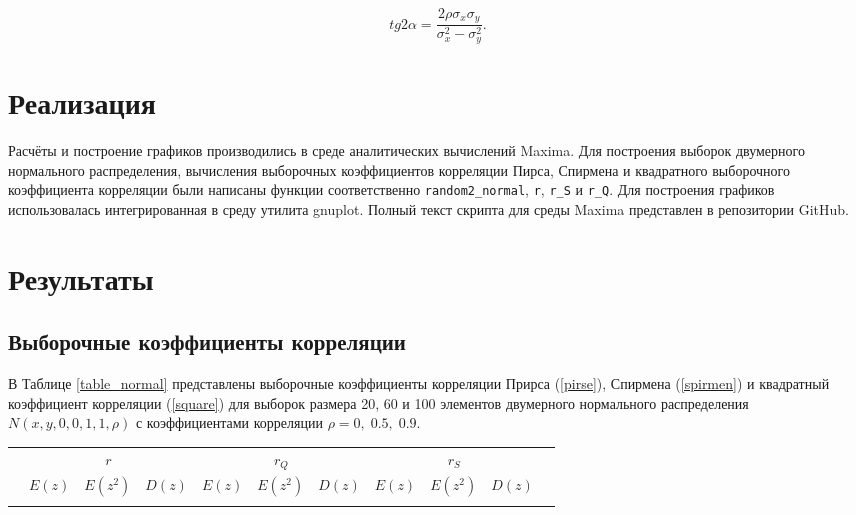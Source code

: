 \documentclass[12pt]{article}
\begin{document}
\begin{flushleft}
    \begin{equation}
        tg 2\alpha = \frac{2\rho\sigma_x\sigma_y}{\sigma_x^2 - \sigma_y^2}.
    \end{equation} 

\newpage

\section{Реализация}

    Расчёты и построение графиков производились в среде аналитических вычислений Maxima. Для построения выборок двумерного нормального распределения, вычисления выборочных коэффициентов корреляции Пирса, Спирмена и квадратного выборочного коэффициента корреляции были написаны функции соответственно \texttt{random2\_normal}, \texttt{r}, \texttt{r\_S} и \texttt{r\_Q}. Для построения графиков использовалась интегрированная в среду утилита gnuplot. Полный текст скрипта для среды Maxima представлен в репозитории GitHub.

\newpage

\section{Результаты}

    \subsection{Выборочные коэффициенты корреляции}

        В Таблице \ref{table_normal} представлены выборочные коэффициенты корреляции Прирса (\ref{pirse}), Спирмена (\ref{spirmen}) и квадратный коэффициент корреляции (\ref{square}) для выборок размера 20, 60 и 100 элементов двумерного нормального распределения $N(x, y, 0, 0, 1, 1, \rho)$ с коэффициентами корреляции $\rho = 0, \; 0.5, \; 0.9$.

        \begin{table}[h]
            \begin{center}
                \begin{tabular}{||c|c||*{3}{c|}|*{3}{c|}|*{3}{c|}|} \hhline{~~|t:===:t:===:t:===:t|}
                \multicolumn{2}{c||}{} & \multicolumn{3}{c||}{$r$} & \multicolumn{3}{c||}{$r_Q$} & \multicolumn{3}{c||}{$r_S$}\\ 
                \hhline{~~||---||---||---||}
                \multicolumn{2}{c||}{} & $E(z)$ & $E(z^2)$ & $D(z)$ & $E(z)$ & $E(z^2)$ & $D(z)$ & $E(z)$ & $E(z^2)$ & $D(z)$\\ 
                \hhline{|t:==::===::===::===:|}


\end{tabular}
\end{center}
\end{table}
\end{flushleft}
\end{document}
